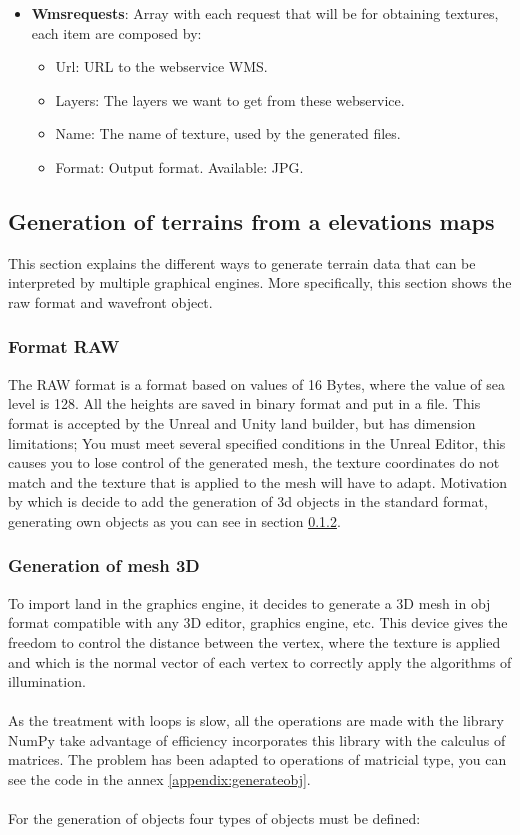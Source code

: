 \documentclass[10pt,a4paper,twocolumn,twoside]{article}
\begin{document}
\begin{itemize}
  \item \textbf{Wmsrequests}: Array with each request that will be for obtaining textures, each item are composed by:
  
  \begin{itemize}
    \item Url: URL to the webservice WMS.
    \item Layers: The layers we want to get from these webservice.
    \item Name: The name of texture, used by the generated files.
    \item Format: Output format. Available: JPG.
  \end{itemize}
  
\end{itemize}

\subsection{Generation of terrains from a elevations maps}

This section explains the different ways to generate terrain data that can be interpreted by multiple graphical engines. More specifically, this section shows the raw format and wavefront object.

\subsubsection{Format RAW}

The RAW format is a format based on values of 16 Bytes, where the value of sea level is 128. All the heights are saved in binary format and put in a file. This format is accepted by the Unreal and Unity land builder, but has dimension limitations; You must meet several specified conditions in the Unreal Editor, this causes you to lose control of the generated mesh, the texture coordinates do not match and the texture that is applied to the mesh will have to adapt. Motivation by which is decide to add the generation of 3d objects in the standard format, generating own objects as you can see in section \ref{mesh3d}.

\subsubsection{Generation of mesh 3D}
\label{mesh3d}
To import land in the graphics engine, it decides to generate a 3D mesh in obj format compatible with any 3D editor, graphics engine, etc. This device gives the freedom to control the distance between the vertex, where the texture is applied and which is the normal vector of each vertex to correctly apply the algorithms of illumination.
\\
\\
As the treatment with loops is slow, all the operations are made with the library NumPy take advantage of efficiency incorporates this library with the calculus of matrices. The problem has been adapted to operations of matricial type, you can see the code in the annex \ref{appendix:generateobj}.
\\
\\
For the generation of objects four types of objects must be defined:
\end{document}
